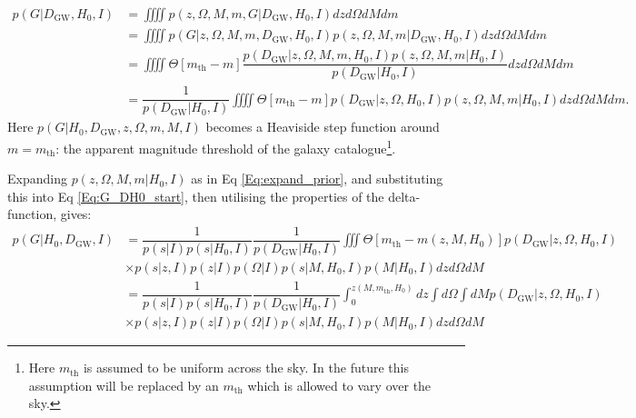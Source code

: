 \documentclass[a4paper,10pt]{article}
\begin{document}
\begin{equation}
\label{Eq:G_DH0_start}
\begin{aligned}
p(G|D_{\text{GW}},H_0,I) &= \iiiint p(z,\Omega,M,m,G|D_{\text{GW}},H_0,I) dz d\Omega dM dm
\\ &= \iiiint p(G|z,\Omega,M,m,D_{\text{GW}},H_0,I) p(z,\Omega,M,m|D_{\text{GW}},H_0,I) dz d\Omega dM dm
\\ &= \iiiint \Theta[m_{\text{th}}-m] \dfrac{p(D_{\text{GW}}|z,\Omega,M,m,H_0,I) p(z,\Omega,M,m|H_0,I)}{p(D_{\text{GW}}|H_0,I)}  dz d\Omega dM dm 
\\ &=  \dfrac{1}{p(D_{\text{GW}}|H_0,I)} \iiiint \Theta[m_{\text{th}}-m] p(D_{\text{GW}}|z,\Omega,H_0,I) p(z,\Omega,M,m|H_0,I) dz d\Omega dM dm.
\end{aligned}
\end{equation}
Here $p(G|H_0,D_{\text{GW}},z,\Omega,m,M,I)$ becomes a Heaviside step function around $m = m_{\text{th}}$: the apparent magnitude threshold of the galaxy catalogue\footnote{Here $m_{\text{th}}$ is assumed to be uniform across the sky.  In the future this assumption will be replaced by an $m_{\text{th}}$ which is allowed to vary over the sky.}.

Expanding $p(z,\Omega,M,m|H_0,I)$ as in Eq \ref{Eq:expand_prior}, and substituting this into Eq \ref{Eq:G_DH0_start}, then utilising the properties of the delta-function, gives:
\begin{equation}
\label{Eq:G_DH0_mid}
\begin{aligned}
p(G|H_0,D_{\text{GW}},I) &= \dfrac{1}{p(s|I)p(s|H_0,I)} \dfrac{1}{p(D_{\text{GW}}|H_0,I)} \iiint \Theta[m_{\text{th}}-m(z,M,H_0)] p(D_{\text{GW}}|z,\Omega,H_0,I) \\ &\times p(s|z,I) p(z|I)p(\Omega|I)p(s|M,H_0,I)p(M|H_0,I) dz d\Omega dM
\\&= \dfrac{1}{p(s|I)p(s|H_0,I)} \dfrac{1}{p(D_{\text{GW}}|H_0,I)} \int^{z(M,m_{\text{th}},H_0)}_0 dz \int d\Omega \int dM p(D_{\text{GW}}|z,\Omega,H_0,I) \\ &\times p(s|z,I) p(z|I)p(\Omega|I)p(s|M,H_0,I)p(M|H_0,I) dz d\Omega dM
\end{aligned}
\end{equation}
\end{document}
